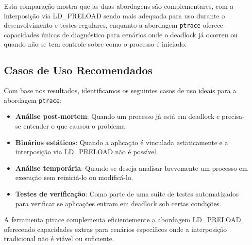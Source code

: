 Esta comparação mostra que as duas abordagens são complementares, com a interposição via LD\_PRELOAD sendo mais adequada para uso durante o desenvolvimento e testes regulares, enquanto a abordagem \texttt{ptrace} oferece capacidades únicas de diagnóstico para cenários onde o deadlock já ocorreu ou quando não se tem controle sobre como o processo é iniciado.

\subsection{Casos de Uso Recomendados}

Com base nos resultados, identificamos os seguintes casos de uso ideais para a abordagem \texttt{ptrace}:

\begin{itemize}
    \item \textbf{Análise post-mortem}: Quando um processo já está em deadlock e precisa-se entender o que causou o problema.

    \item \textbf{Binários estáticos}: Quando a aplicação é vinculada estaticamente e a interposição via LD\_PRELOAD não é possível.

    \item \textbf{Análise temporária}: Quando se deseja analisar brevemente um processo em execução sem reiniciá-lo ou modificá-lo.

    \item \textbf{Testes de verificação}: Como parte de uma suite de testes automatizados para verificar se aplicações entram em deadlock sob certas condições.
\end{itemize}

A ferramenta ptrace complementa eficientemente a abordagem LD\_PRELOAD, oferecendo capacidades extras para cenários específicos onde a interposição tradicional não é viável ou suficiente.
